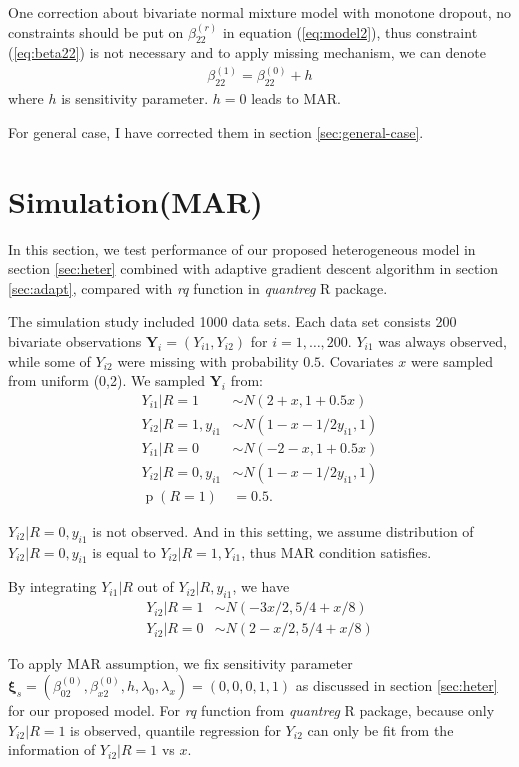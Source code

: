 \documentclass[12pt]{article}
\DeclareMathOperator{\pr}{p}
\begin{document}
One correction about bivariate normal mixture model with monotone
dropout, no constraints should be put on $\beta_{22}^{(r)}$ in
equation (\ref{eq:model2}), thus constraint (\ref{eq:beta22}) is not
necessary and to apply missing mechanism, we can denote
\begin{align*}
  \beta_{22}^{(1)} = \beta_{22}^{(0)} + h
\end{align*}
where $h$ is sensitivity parameter.  $h = 0$ leads to MAR.

For general case, I have corrected them in section
\ref{sec:general-case}.

\section{Simulation(MAR)}

In this section, we test performance of our proposed heterogeneous
model in section \ref{sec:heter} combined with adaptive gradient
descent algorithm in section \ref{sec:adapt}, compared with
\textit{rq} function in \textit{quantreg} R package.

The simulation study included 1000 data sets. Each data set consists
200 bivariate observations $\bm Y_i = (Y_{i1}, Y_{i2})$ for $i = 1,
\ldots, 200$. $Y_{i1}$ was always observed, while some of $Y_{i2}$
were missing with probability $0.5$. Covariates $x$ were sampled from
uniform (0,2). We sampled $\bm Y_i$ from:
\begin{align*}
  Y_{i1} |R = 1 & \sim N ( 2 + x, 1 + 0.5x)\\
  Y_{i2} | R = 1, y_{i1} & \sim N(1 - x - 1/2y_{i1}, 1) \\
  Y_{i1}| R= 0 & \sim N(-2 - x, 1 + 0.5x) \\
  Y_{i2}| R= 0, y_{i1} & \sim N(1 - x - 1/2y_{i1}, 1) \\
  \pr (R = 1) & = 0.5.
\end{align*}

$Y_{i2}| R = 0, y_{i1}$ is not observed. And in this setting, we
assume distribution of $Y_{i2} | R = 0, y_{i1}$ is equal to $Y_{i2}|
R= 1, Y_{i1}$, thus MAR condition satisfies.

By integrating $Y_{i1}|R$ out of $Y_{i2}|R, y_{i1}$, we have
\begin{align*}
  Y_{i2} | R = 1 & \sim N( - 3x/2, 5/4 + x/8) \\
  Y_{i2} | R = 0 & \sim N( 2 - x/2, 5/4 + x/8)
\end{align*}

To apply MAR assumption, we fix sensitivity parameter $\bm \xi_s =
(\beta_{02}^{(0)}, \beta_{x2}^{(0)}, h, \lambda_0, \lambda_x) =
(0,0,0,1,1)$ as discussed in section \ref{sec:heter} for our proposed
model. For \textit{rq} function from \textit{quantreg} R package,
because only $Y_{i2}| R = 1$ is observed, quantile regression for
$Y_{i2}$ can only be fit from the information of $Y_{i2}|R = 1$ vs
$x$.
\end{document}
